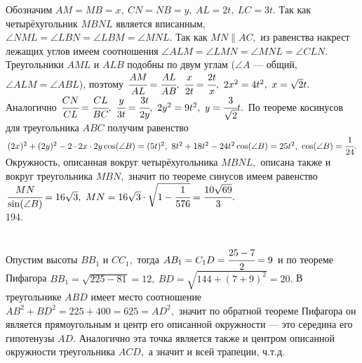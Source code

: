 \documentclass[12pt]{article}
\begin{document}
Обозначим $AM=MB=x,\ CN=NB=y,\ AL=2t,\ LC=3t.$ Так как четырёхугольник $MBNL$ является вписанным, $\angle NML=\angle LBN=\angle LBM=\angle MNL.$ Так как $MN\parallel AC,$ из равенства накрест лежащих углов имеем соотношения $\angle ALM=\angle LMN=\angle MNL=\angle CLN.$ Треугольники $AML$ и $ALB$ подобны по двум углам ($\angle A$ --- общий, $\angle ALM=\angle ABL$), поэтому $\cfrac{AM}{AL}=\cfrac{AL}{AB},\ \cfrac{x}{2t}=\cfrac{2t}{x},\ 2x^2=4t^2,\ x=\sqrt{2}t.$ Аналогично $\cfrac{CN}{CL}=\cfrac{CL}{BC},\ \cfrac{y}{3t}=\cfrac{3t}{2y},\ 2y^2=9t^2,\ y=\cfrac{3}{\sqrt{2}}t.$ По теореме косинусов для треугольника $ABC$ получим равенство $(2x)^2+(2y)^2-2\cdot2x\cdot2y\cos(\angle B)=(5t)^2,\
8t^2+18t^2-24t^2\cos(\angle B)=25t^2,\ \cos(\angle B)=\cfrac{1}{24}.$ Окружность, описанная вокруг четырёхугольника $MBNL,$ описана также и вокруг треугольника $MBN,$ значит по теореме синусов имеем равенство $\cfrac{MN}{\sin(\angle B)}=16\sqrt{3},\ MN=16\sqrt{3}\cdot\sqrt{1-\cfrac{1}{576}}=\cfrac{10\sqrt{69}}{3}.$\\
194. \begin{figure}[ht!]
\end{figure}\\
Опустим высоты $BB_1$ и $CC_1,$ тогда $AB_1=C_1D=\cfrac{25-7}{2}=9$ и по теореме Пифагора $BB_1=\sqrt{225-81}=12,\ BD=\sqrt{144+(7+9)^2}=20.$ В треугольнике $ABD$ имеет место соотношение $AB^2+BD^2=225+400=625=AD^2,$ значит по обратной теореме Пифагора он является прямоугольным и центр его описанной окружности --- это середина его гипотенузы $AD.$ Аналогично эта точка является также и центром описанной окружности треугольника $ACD,$ а значит и всей трапеции, ч.т.д.\newpage\noindent
\end{document}
